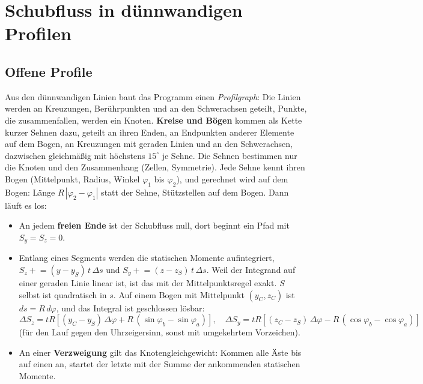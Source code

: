 \section{Schubfluss in dünnwandigen Profilen}\label{sec:mathe-schub}

\subsection{Offene Profile}

Aus den dünnwandigen Linien baut das Programm einen \emph{Profilgraph}: Die Linien werden an
Kreuzungen, Berührpunkten und an den Schwerachsen geteilt, Punkte, die zusammenfallen, werden ein
Knoten. \textbf{Kreise und Bögen} kommen als Kette kurzer Sehnen dazu, geteilt an ihren Enden, an
Endpunkten anderer Elemente auf dem Bogen, an Kreuzungen mit geraden Linien und an den Schwerachsen,
dazwischen gleichmäßig mit höchstens $15^\circ$ je Sehne. Die Sehnen bestimmen nur die Knoten und
den Zusammenhang (Zellen, Symmetrie). Jede Sehne kennt ihren Bogen (Mittelpunkt, Radius, Winkel
$\varphi_1$ bis $\varphi_2$), und gerechnet wird auf dem Bogen: Länge $R\,|\varphi_2 - \varphi_1|$
statt der Sehne, Stützstellen auf dem Bogen. Dann läuft es los:

\begin{itemize}
  \item An jedem \textbf{freien Ende} ist der Schubfluss null, dort beginnt ein Pfad mit
        $S_y = S_z = 0$.
  \item Entlang eines Segments werden die statischen Momente aufintegriert,
        $S_z \mathrel{+}= (y - y_S)\,t\,\Delta s$ und $S_y \mathrel{+}= (z - z_S)\,t\,\Delta s$. Weil
        der Integrand auf einer geraden Linie linear ist, ist das mit der Mittelpunktsregel exakt.
        $S$ selbst ist quadratisch in $s$. Auf einem Bogen mit Mittelpunkt $(y_C, z_C)$ ist
        $ds = R\,d\varphi$, und das Integral ist geschlossen lösbar:
        \[
          \Delta S_z = t R \left[(y_C - y_S)\,\Delta\varphi + R\,(\sin\varphi_b - \sin\varphi_a)\right],
          \quad
          \Delta S_y = t R \left[(z_C - z_S)\,\Delta\varphi - R\,(\cos\varphi_b - \cos\varphi_a)\right]
        \]
        (für den Lauf gegen den Uhrzeigersinn, sonst mit umgekehrtem Vorzeichen).
  \item An einer \textbf{Verzweigung} gilt das Knotengleichgewicht: Kommen alle Äste bis auf einen an,
        startet der letzte mit der Summe der ankommenden statischen Momente.
\end{itemize}

